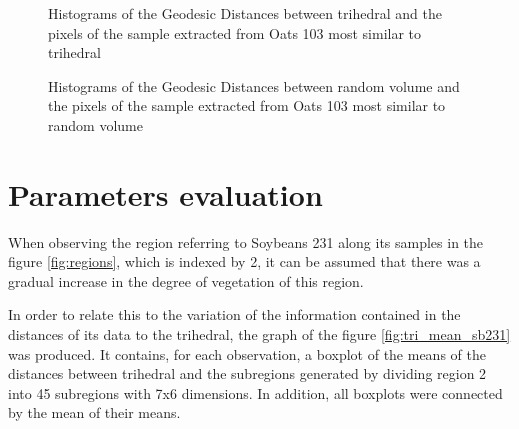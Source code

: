 \documentclass[12pt]{article}
\begin{document}
\begin{figure*}[hbt]
\centering
{}
\caption{Histograms of the Geodesic Distances between trihedral and the pixels of the sample extracted from Oats 103 most similar to trihedral}
\label{fig:ot103_hist_tri}
\end{figure*}

\begin{figure*}[hbt]
\centering
{}
\caption{Histograms of the Geodesic Distances between random volume and the pixels of the sample extracted from Oats 103 most similar to random volume}
\label{fig:ot103_hist_rv}
\end{figure*}

\section{Parameters evaluation}
When observing the region referring to Soybeans 231 along its samples in the figure \ref{fig:regions}, which is indexed by 2, it can be assumed that there was a gradual increase in the degree of vegetation of this region.

In order to relate this to the variation of the information contained in the distances of its data to the trihedral, the graph of the figure \ref{fig:tri_mean_sb231} was produced. It contains, for each observation, a boxplot of the means of the distances between trihedral and the subregions generated by dividing region 2 into 45 subregions with 7x6 dimensions. In addition, all boxplots were connected by the mean of their means.
\end{document}
